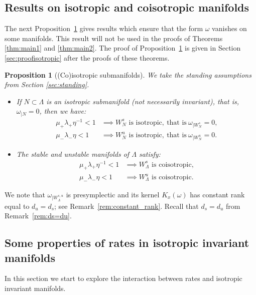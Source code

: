 \documentclass[11pt]{amsart}
\newtheorem{prop}[thm]{Proposition}
\theoremstyle{definition}
\theoremstyle{remark}
\numberwithin{equation}{section}
\begin{document}
\subsection{Results on isotropic and coisotropic manifolds}

The next Proposition~\ref{lem:degeneracy} gives results which ensure that the form $\omega$ vanishes on some  manifolds.
This result will not be used in the  proofs of Theorems \ref{thm:main1} and \ref{thm:main2}. The proof of Proposition~\ref{lem:degeneracy}
is given in Section \ref{sec:proofisotropic} after the proofs of these theorems.



\begin{prop}[(Co)isotropic submanifolds]
  \label{lem:degeneracy}
 We take the standing assumptions from Section \ref{sec:standing}.
\begin{itemize}
\item[(i)]
If $N\subset \Lambda$ is an  isotropic submanifold  (not necessarily invariant),  that is, $\omega_{\mid N}=0$,  then we have:
\begin{equation} \label{eqn:vanishing_lagrangianmanifolds}
\begin{split}
\mu_+\lambda_+ \eta^{-1}<1 & \implies W^s_N \textrm{ is isotropic},  \ \text{that is} \ \omega_{\mid W^s_N} = 0 ,
\\
\mu_-\lambda_- \eta  < 1 &\implies  W^u_N  \textrm{ is isotropic}, \ \text{that is} \  \omega_{\mid W^u_N}= 0.
\end{split}
\end{equation}
\item[(ii)]
The stable and unstable manifolds of $\Lambda$ satisfy:
\begin{equation}\label{eqn:vanishing_2}
\begin{split}
\mu_+ \lambda_+ \eta^{-1}  < 1 &   \implies W^s_\Lambda  \textrm{ is coisotropic},\\
\mu_- \lambda_- \eta  < 1 & \implies  W^u_\Lambda  \textrm{ is coisotropic}.
\end{split}
\end{equation}
\end{itemize}
\end{prop}

We note that $\omega_{\mid W^{s,u}_\Lambda}$ is presymplectic and its kernel $K_x(\omega)$ has constant rank equal to $d_u=d_s$; see Remark~\ref{rem:constant_rank}. Recall that $d_s=d_u$ from Remark~\ref{rem:ds=du}.


\subsection{Some properties of rates in isotropic invariant manifolds}
\label{sec:isotropic}
In this section we start to explore
the interaction between rates and isotropic invariant manifolds.
\end{document}
